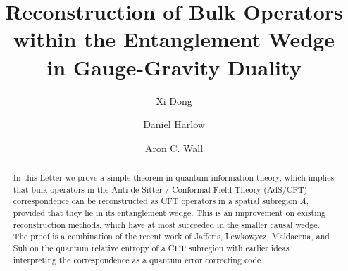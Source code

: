 \documentclass[aps,prl,twocolumn,nofootinbib,longbibliography,superscriptaddress]{revtex4-1}
\begin{document}
\title{Reconstruction of Bulk Operators within the Entanglement Wedge
\\in Gauge-Gravity Duality}
\author{Xi Dong}
\author{Daniel Harlow}
\author{Aron C. Wall}
\begin{abstract}
In this Letter we prove a simple theorem in quantum information theory, which implies that bulk operators in the Anti-de Sitter / Conformal Field Theory (AdS/CFT) correspondence can be reconstructed as CFT operators in a spatial subregion $A$, provided that they lie in its entanglement wedge.  This is an improvement on existing reconstruction methods, which have at most succeeded in the smaller causal wedge.  The proof is a combination of the recent work of Jafferis, Lewkowycz, Maldacena, and Suh on the quantum relative entropy of a CFT subregion with earlier ideas interpreting the correspondence as a quantum error correcting code.
\end{abstract}

\maketitle
\end{document}
